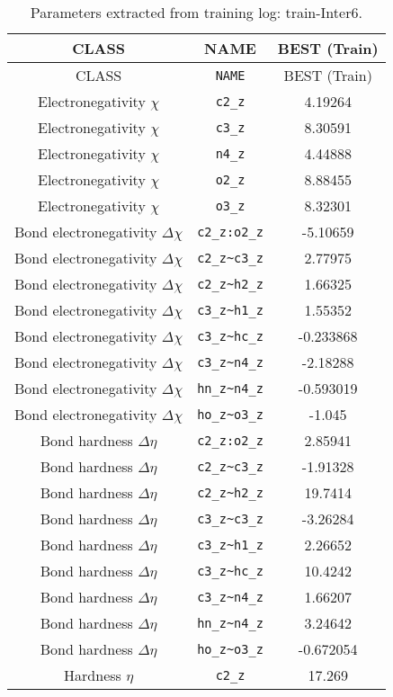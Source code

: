\begin{table}[ht]
\caption{Parameters extracted from training log: train-Inter6.}
\begin{tabular}{|c|c|c|}
\hline
CLASS & NAME & BEST (Train) \\ 
\hline
CLASS & \verb^NAME^ & BEST (Train) \\ 
Electronegativity $\chi$ & \verb^c2_z^ & 4.19264 \\ 
Electronegativity $\chi$ & \verb^c3_z^ & 8.30591 \\ 
Electronegativity $\chi$ & \verb^n4_z^ & 4.44888 \\ 
Electronegativity $\chi$ & \verb^o2_z^ & 8.88455 \\ 
Electronegativity $\chi$ & \verb^o3_z^ & 8.32301 \\ 
Bond electronegativity $\Delta\chi$ & \verb^c2_z:o2_z^ & -5.10659 \\ 
Bond electronegativity $\Delta\chi$ & \verb^c2_z~c3_z^ & 2.77975 \\ 
Bond electronegativity $\Delta\chi$ & \verb^c2_z~h2_z^ & 1.66325 \\ 
Bond electronegativity $\Delta\chi$ & \verb^c3_z~h1_z^ & 1.55352 \\ 
Bond electronegativity $\Delta\chi$ & \verb^c3_z~hc_z^ & -0.233868 \\ 
Bond electronegativity $\Delta\chi$ & \verb^c3_z~n4_z^ & -2.18288 \\ 
Bond electronegativity $\Delta\chi$ & \verb^hn_z~n4_z^ & -0.593019 \\ 
Bond electronegativity $\Delta\chi$ & \verb^ho_z~o3_z^ & -1.045 \\ 
Bond hardness $\Delta\eta$ & \verb^c2_z:o2_z^ & 2.85941 \\ 
Bond hardness $\Delta\eta$ & \verb^c2_z~c3_z^ & -1.91328 \\ 
Bond hardness $\Delta\eta$ & \verb^c2_z~h2_z^ & 19.7414 \\ 
Bond hardness $\Delta\eta$ & \verb^c3_z~c3_z^ & -3.26284 \\ 
Bond hardness $\Delta\eta$ & \verb^c3_z~h1_z^ & 2.26652 \\ 
Bond hardness $\Delta\eta$ & \verb^c3_z~hc_z^ & 10.4242 \\ 
Bond hardness $\Delta\eta$ & \verb^c3_z~n4_z^ & 1.66207 \\ 
Bond hardness $\Delta\eta$ & \verb^hn_z~n4_z^ & 3.24642 \\ 
Bond hardness $\Delta\eta$ & \verb^ho_z~o3_z^ & -0.672054 \\ 
Hardness $\eta$ & \verb^c2_z^ & 17.269 \\ 

\end{tabular}
\end{table}
